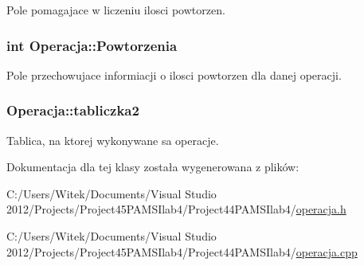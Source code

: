 Pole pomagajace w liczeniu ilosci powtorzen. 

\hypertarget{class_operacja_aa568b17d05f31132b3d97eb5b7e93d61}{
\subsubsection[{Powtorzenia}]{\setlength{\rightskip}{0pt plus 5cm}int Operacja\-::\-Powtorzenia}}\label{class_operacja_aa568b17d05f31132b3d97eb5b7e93d61}


Pole przechowujace informiacji o ilosci powtorzen dla danej operacji. 

\hypertarget{class_operacja_abf2eb42f0b32b1528939aa39e0ebd528}{
\subsubsection[{tabliczka2}]{ Operacja\-::tabliczka2}}\label{class_operacja_abf2eb42f0b32b1528939aa39e0ebd528}


Tablica, na ktorej wykonywane sa operacje. 



Dokumentacja dla tej klasy została wygenerowana z plików\-:\begin{DoxyCompactItemize}
\item 
C\-:/\-Users/\-Witek/\-Documents/\-Visual Studio 2012/\-Projects/\-Project45\-P\-A\-M\-S\-Ilab4/\-Project44\-P\-A\-M\-S\-Ilab4/\hyperlink{operacja_8h}{operacja.\-h}\item 
C\-:/\-Users/\-Witek/\-Documents/\-Visual Studio 2012/\-Projects/\-Project45\-P\-A\-M\-S\-Ilab4/\-Project44\-P\-A\-M\-S\-Ilab4/\hyperlink{operacja_8cpp}{operacja.\-cpp}\end{DoxyCompactItemize}
